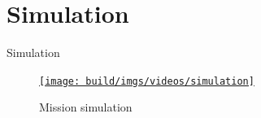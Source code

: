 \documentclass[10pt, xcolor={usenames, dvipsnames}]{beamer}
\begin{document}
    \section{Simulation}

        \begin{frame}{Simulation}
            \centering
            \begin{minipage}[c]{0.95\textwidth}
                \begin{figure}
                    \href{run:simulation.mkv?autostart&loop}{\texttt{[image: build/imgs/videos/simulation]}}
                    \caption{Mission simulation}
                \end{figure}
            \end{minipage}
        \end{frame}
\end{document}
